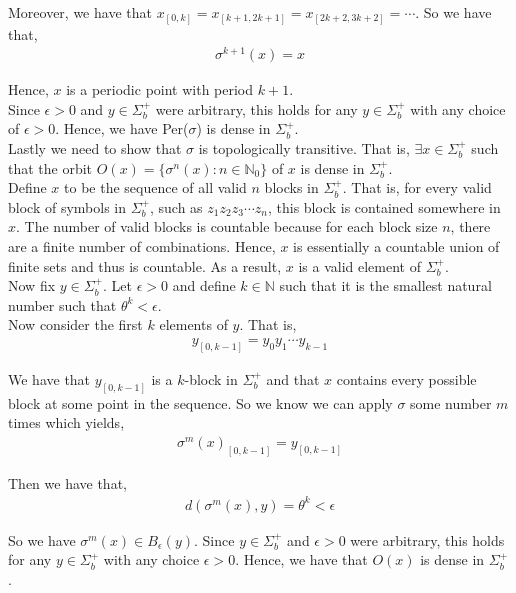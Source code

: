 \documentclass[12pt]{article}
\begin{document}
Moreover, we have that $x_{[0, k]} = x_{[k+1, 2k+1]} = x_{[2k+2, 3k+2]} = \cdots$. So we have that,
\begin{align*}
\sigma^{k+1}(x) = x
\end{align*}

Hence, $x$ is a periodic point with period $k+1$.\\

Since $\epsilon > 0$ and $y \in \Sigma_b^+$ were arbitrary, this holds for any $y \in \Sigma_b^+$ with any choice of $\epsilon > 0$. Hence, we have Per($\sigma$) is dense in $\Sigma_b^+$.\\

Lastly we need to show that $\sigma$ is topologically transitive. That is, $\exists x \in \Sigma_b^+$ such that the orbit $O(x) = \{\sigma^n(x) : n \in \mathbb{N}_0\}$ of $x$ is dense in $\Sigma_b^+$.\\

Define $x$ to be the sequence of all valid $n$ blocks in $\Sigma_b^+$. That is, for every valid block of symbols in $\Sigma_b^+$, such as $z_1z_2z_3\cdots z_n$, this block is contained somewhere in $x$. The number of valid blocks is countable because for each block size $n$, there are a finite number of combinations. Hence, $x$ is essentially a countable union of finite sets and thus is countable. As a result, $x$ is a valid element of $\Sigma_b^+$.\\

Now fix $y \in \Sigma_b^+$. Let $\epsilon > 0$ and define $k \in \mathbb{N}$ such that it is the smallest natural number such that $\theta^k < \epsilon$.\\

Now consider the first $k$ elements of $y$. That is,
\begin{align*}
y_{[0, k-1]} = y_0y_1\cdots y_{k-1}
\end{align*}

We have that $y_{[0, k-1]}$ is a $k$-block in $\Sigma_b^+$ and that $x$ contains every possible block at some point in the sequence. So we know we can apply $\sigma$ some number $m$ times which yields,
\begin{align*}
\sigma^m(x)_{[0, k-1]} = y_{[0, k-1]}
\end{align*}

Then we have that,
\begin{align*}
d(\sigma^m(x), y) = \theta^k < \epsilon
\end{align*}

So we have $\sigma^m(x) \in B_{\epsilon}(y)$. Since $y \in \Sigma_b^+$ and $\epsilon > 0$ were arbitrary, this holds for any $y \in \Sigma_b^+$ with any choice $\epsilon > 0$. Hence, we have that $O(x)$ is dense in $\Sigma_b^+$.\\
\end{document}
